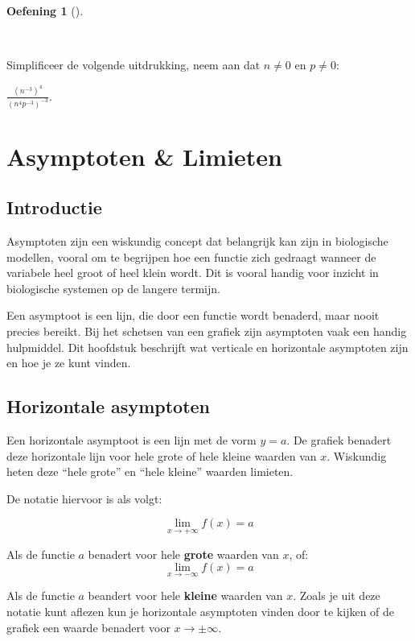 \documentclass[
  a4paper,
]{scrbook}
\theoremstyle{definition}
\newtheorem{exercise}{Oefening}[chapter]
\theoremstyle{remark}
\begin{document}
\begin{exercise}[]\protect\hypertarget{exr-exp-6}{}\label{exr-exp-6}

~

Simplificeer de volgende uitdrukking, neem aan dat \(n\neq0\) en
\(p\neq0\):

\(\frac{(n^{-3})^4}{(n^{4}p^{-3})^{-3}}\).

\end{exercise}

\hypertarget{sec-limieten}{%
\chapter{Asymptoten \& Limieten}\label{sec-limieten}}

\hypertarget{introductie-3}{%
\section{Introductie}\label{introductie-3}}

Asymptoten zijn een wiskundig concept dat belangrijk kan zijn in
biologische modellen, vooral om te begrijpen hoe een functie zich
gedraagt wanneer de variabele heel groot of heel klein wordt. Dit is
vooral handig voor inzicht in biologische systemen op de langere
termijn.

Een asymptoot is een lijn, die door een functie wordt benaderd, maar
nooit precies bereikt. Bij het schetsen van een grafiek zijn asymptoten
vaak een handig hulpmiddel. Dit hoofdstuk beschrijft wat verticale en
horizontale asymptoten zijn en hoe je ze kunt vinden.

\hypertarget{horizontale-asymptoten}{%
\section{Horizontale asymptoten}\label{horizontale-asymptoten}}

Een horizontale asymptoot is een lijn met de vorm \(y=a\). De grafiek
benadert deze horizontale lijn voor hele grote of hele kleine waarden
van \(x\). Wiskundig heten deze ``hele grote'' en ``hele kleine''
waarden limieten.

De notatie hiervoor is als volgt:

\[\lim_{x \rightarrow +\infty}{f(x)} = a\]

Als de functie \(a\) benadert voor hele \textbf{grote} waarden van
\(x\), of: \[\lim_{x \rightarrow -\infty}{f(x)} = a\]

Als de functie \(a\) beandert voor hele \textbf{kleine} waarden van
\(x\). Zoals je uit deze notatie kunt aflezen kun je horizontale
asymptoten vinden door te kijken of de grafiek een waarde benadert voor
\(x \rightarrow \pm \infty\).
\end{document}
